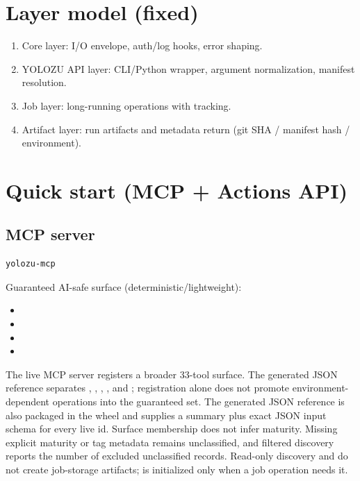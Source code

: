 \section{Layer model (fixed)}

\begin{enumerate}
  \item Core layer: I/O envelope, auth/log hooks, error shaping.
  \item YOLOZU API layer: CLI/Python wrapper, argument normalization, manifest resolution.
  \item Job layer: long-running operations with  tracking.
  \item Artifact layer: run artifacts and metadata return (git SHA / manifest hash / environment).
\end{enumerate}

\section{Quick start (MCP + Actions API)}

\subsection{MCP server}
\begin{lstlisting}[language=bash]
yolozu-mcp
\end{lstlisting}

Guaranteed AI-safe surface (deterministic/lightweight):
\begin{itemize}
  \item {}
  \item {}
  \item {}
  \item {}
\end{itemize}

The live MCP server registers a broader 33-tool surface. The generated JSON
reference separates , ,
, , and ; registration alone does not
promote environment-dependent operations into the guaranteed set.
The generated JSON reference is also packaged in the wheel and supplies a
summary plus exact JSON input schema for every live id. Surface membership does
not infer maturity. Missing explicit maturity or tag metadata remains
unclassified, and filtered discovery reports the number of excluded
unclassified records.
Read-only discovery and  do not create job-storage artifacts;
 is initialized only when a job operation needs it.

